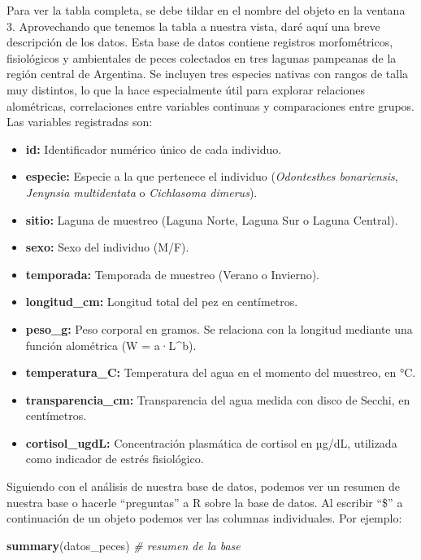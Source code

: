 \documentclass[
]{article}
\newenvironment{Shaded}{\begin{snugshade}}{\end{snugshade}}
\newcommand{\CommentTok}[1]{\textcolor[rgb]{0.56,0.35,0.01}{\textit{#1}}}
\newcommand{\FunctionTok}[1]{\textcolor[rgb]{0.13,0.29,0.53}{\textbf{#1}}}
\newcommand{\NormalTok}[1]{#1}
\begin{document}
Para ver la tabla completa, se debe tildar en el nombre del objeto en la
ventana 3. Aprovechando que tenemos la tabla a nuestra vista, daré aquí
una breve descripción de los datos. Esta base de datos contiene
registros morfométricos, fisiológicos y ambientales de peces colectados
en tres lagunas pampeanas de la región central de Argentina. Se incluyen
tres especies nativas con rangos de talla muy distintos, lo que la hace
especialmente útil para explorar relaciones alométricas, correlaciones
entre variables continuas y comparaciones entre grupos. Las variables
registradas son:

\begin{itemize}
\item
  \textbf{id:} Identificador numérico único de cada individuo.
\item
  \textbf{especie:} Especie a la que pertenece el individuo
  (\emph{Odontesthes bonariensis}, \emph{Jenynsia multidentata} o
  \emph{Cichlasoma dimerus}).
\item
  \textbf{sitio:} Laguna de muestreo (Laguna Norte, Laguna Sur o Laguna
  Central).
\item
  \textbf{sexo:} Sexo del individuo (M/F).
\item
  \textbf{temporada:} Temporada de muestreo (Verano o Invierno).
\item
  \textbf{longitud\_cm:} Longitud total del pez en centímetros.
\item
  \textbf{peso\_g:} Peso corporal en gramos. Se relaciona con la
  longitud mediante una función alométrica (W = a·L\^{}b).
\item
  \textbf{temperatura\_C:} Temperatura del agua en el momento del
  muestreo, en °C.
\item
  \textbf{transparencia\_cm:} Transparencia del agua medida con disco de
  Secchi, en centímetros.
\item
  \textbf{cortisol\_ugdL:} Concentración plasmática de cortisol en
  µg/dL, utilizada como indicador de estrés fisiológico.
\end{itemize}

Siguiendo con el análisis de nuestra base de datos, podemos ver un
resumen de nuestra base o hacerle ``preguntas'' a R sobre la base de
datos. Al escribir ``\$'' a continuación de un objeto podemos ver las
columnas individuales. Por ejemplo:

\begin{Shaded}
\begin{Highlighting}[]
\FunctionTok{summary}\NormalTok{(datos\_peces) }\CommentTok{\# resumen de la base}
\end{Highlighting}
\end{Shaded}
\end{document}

